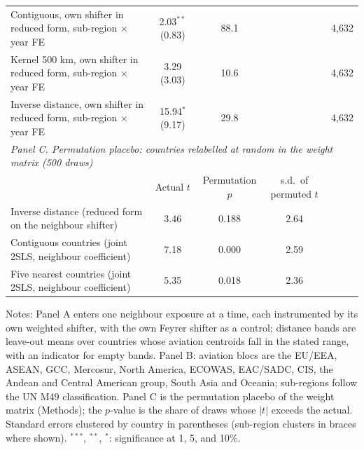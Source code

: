 \documentclass[12pt]{extarticle}
\begin{document}
\begin{table}[H]
{\begin{threeparttable}
\begin{tabular}{lcccc}
  Contiguous, own shifter in reduced form, sub-region $\times$ year FE & 2.03$^{**}$ (0.83) & 88.1 & & 4,632 \\
  Kernel 500 km, own shifter in reduced form, sub-region $\times$ year FE & 3.29 (3.03) & 10.6 & & 4,632 \\
  Inverse distance, own shifter in reduced form, sub-region $\times$ year FE & 15.94$^{*}$ (9.17) & 29.8 & & 4,632 \\
\midrule
\multicolumn{5}{l}{\textit{Panel C. Permutation placebo: countries relabelled at random in the weight matrix (500 draws)}} \\
 & Actual $t$ & Permutation $p$ & s.d.\ of permuted $t$ & \\
  Inverse distance (reduced form on the neighbour shifter) & 3.46 & 0.188 & 2.64 & \\
  Contiguous countries (joint 2SLS, neighbour coefficient) & 7.18 & 0.000 & 2.59 & \\
  Five nearest countries (joint 2SLS, neighbour coefficient) & 5.35 & 0.018 & 2.36 & \\
\bottomrule
\end{tabular}
\begin{tablenotes}[flushleft]
\scriptsize
\item Notes: Panel A enters one neighbour exposure at a time, each instrumented by its own weighted shifter, with the own Feyrer shifter as a control; distance bands are leave-out means over countries whose aviation centroids fall in the stated range, with an indicator for empty bands. Panel B: aviation blocs are the EU/EEA, ASEAN, GCC, Mercosur, North America, ECOWAS, EAC/SADC, CIS, the Andean and Central American group, South Asia and Oceania; sub-regions follow the UN M49 classification. Panel C is the permutation placebo of the weight matrix (Methods); the $p$-value is the share of draws whose $|t|$ exceeds the actual. Standard errors clustered by country in parentheses (sub-region clusters in braces where shown). $^{***}$, $^{**}$, $^{*}$: significance at 1, 5, and 10\%.
\end{tablenotes}
\end{threeparttable}}
\end{table}
\end{document}
